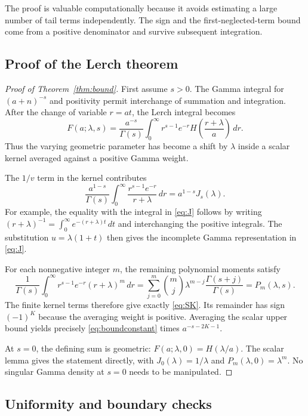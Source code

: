 \documentclass[11pt,a4paper]{article}
\begin{document}
The proof is valuable computationally because it avoids estimating a large
number of tail terms independently. The sign and the first-neglected-term
bound come from a positive denominator and survive subsequent integration.

\subsection{Proof of the Lerch theorem}

\begin{proof}[Proof of Theorem~\ref{thm:bound}]
First assume $s>0$. The Gamma integral for $(a+n)^{-s}$ and positivity permit
interchange of summation and integration. After the change of variable
$r=at$, the Lerch integral becomes
\begin{equation}
 F(a;\lambda,s)=\frac{a^{-s}}{\Gamma(s)}
 \int_0^\infty r^{s-1}e^{-r}
 H\!\left(\frac{r+\lambda}{a}\right)\,dr.
 \label{eq:gammaaverage}
\end{equation}
Thus the varying geometric parameter has become a shift by $\lambda$ inside
a scalar kernel averaged against a positive Gamma weight.

The $1/v$ term in the kernel contributes
\[
 \frac{a^{1-s}}{\Gamma(s)}
 \int_0^\infty\frac{r^{s-1}e^{-r}}{r+\lambda}\,dr
 =a^{1-s}J_s(\lambda).
\]
For example, the equality with the integral in \eqref{eq:J} follows by writing
$(r+\lambda)^{-1}=\int_0^\infty e^{-(r+\lambda)t}\,dt$ and interchanging the
positive integrals. The substitution $u=\lambda(1+t)$ then gives the incomplete
Gamma representation in \eqref{eq:J}.

For each nonnegative integer $m$, the remaining polynomial moments satisfy
\[
 \frac1{\Gamma(s)}\int_0^\infty r^{s-1}e^{-r}(r+\lambda)^m\,dr
 =\sum_{j=0}^m\binom mj\lambda^{m-j}\frac{\Gamma(s+j)}{\Gamma(s)}
 =P_m(\lambda,s).
\]
The finite kernel terms therefore give exactly \eqref{eq:SK}. Its remainder
has sign $(-1)^K$ because the averaging weight is positive. Averaging the
scalar upper bound yields precisely \eqref{eq:boundconstant} times
$a^{-s-2K-1}$.

At $s=0$, the defining sum is geometric:
$F(a;\lambda,0)=H(\lambda/a)$. The scalar lemma gives the statement directly,
with $J_0(\lambda)=1/\lambda$ and $P_m(\lambda,0)=\lambda^m$.
No singular Gamma density at $s=0$ needs to be manipulated.
\end{proof}

\subsection{Uniformity and boundary checks}
\end{document}

